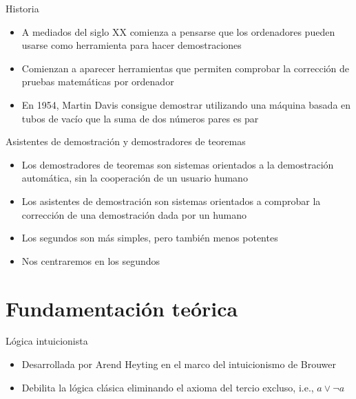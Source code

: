 \documentclass[10pt]{beamer}
\begin{document}
\begin{frame}{Historia}

  \begin{itemize}
  \item A mediados del siglo XX comienza a pensarse que los
    ordenadores pueden usarse como herramienta para hacer
    demostraciones
  \item Comienzan a aparecer herramientas que permiten comprobar la
    corrección de pruebas matemáticas por ordenador
  \item En 1954, Martin Davis consigue demostrar utilizando una
    máquina basada en tubos de vacío que la suma de dos números pares
    es par
  \end{itemize}

\end{frame}

\begin{frame}{Asistentes de demostración y demostradores de teoremas}

  \begin{itemize}
  \item Los demostradores de teoremas son sistemas orientados a la
    demostración automática, sin la cooperación de un usuario humano
  \item Los asistentes de demostración son sistemas orientados a
    comprobar la corrección de una demostración dada por un humano
  \item Los segundos son más simples, pero también menos potentes
  \item Nos centraremos en los segundos
  \end{itemize}

\end{frame}

\section{Fundamentación teórica}

\begin{frame}[fragile]{Lógica intuicionista}

  \begin{itemize}
  \item Desarrollada por Arend Heyting en el marco del intuicionismo
    de Brouwer
  \item Debilita la lógica clásica eliminando el axioma del tercio
    excluso, i.e., $a \lor \neg a$
  \end{itemize}

\end{frame}
\end{document}
